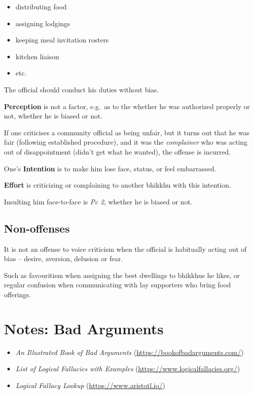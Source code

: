 \begin{itemize}
\tightlist
\item
  distributing food
\item
  assigning lodgings
\item
  keeping meal invitation rosters
\item
  kitchen liaison
\item
  etc.
\end{itemize}

The official should conduct his duties without bias.

\textbf{Perception} is not a factor, e.g.~as to the whether he was
authorized properly or not, whether he is biased or not.

\clearpage

If one criticises a community official as being unfair, but it turns out
that he was fair (following established procedure), and it was the
\emph{complainer} who was acting out of disappointment (didn't get what
he wanted), the offense is incurred.

One's \textbf{Intention} is to make him lose face, status, or feel
embarrassed.

\textbf{Effort} is criticizing or complaining to another bhikkhu with
this intention.

Insulting him face-to-face is \emph{Pc 2}, whether he is biased or not.

\subsection{Non-offenses}

It is not an offense to voice criticism when the official is habitually
acting out of bias -- desire, aversion, delusion or fear.

Such as favouritism when assigning the best dwellings to bhikkhus he
likes, or regular confusion when communicating with lay supporters who
bring food offerings.

\bigskip

\section{Notes: Bad Arguments}

\bigskip

\begin{itemize}
\tightlist
\item
  \emph{An Illustrated Book of Bad Arguments}
  (\url{https://bookofbadarguments.com/})
\item
  \emph{List of Logical Fallacies with Examples}
  (\url{https://www.logicalfallacies.org/})
\item
  \emph{Logical Fallacy Lookup} (\url{https://www.aristotl.io/})
\end{itemize}

